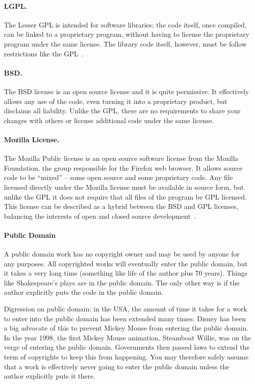 \paragraph{LGPL.} The Lesser GPL is intended for software libraries; the code itself, once compiled, can be linked to a proprietary program, without having to license the proprietary program under the same license. The library code itself, however, must be follow restrictions like the GPL~\cite{atwood:lic}.

\paragraph{BSD.} The BSD license is an open source license and it is quite permissive. It effectively allows any use of the code, even turning it into a proprietary product, but disclaims all liability. Unlike the GPL, there are no requirements to share your changes with others or license additional code under the same license.


\paragraph{Mozilla License.} The Mozilla Public license is an open source software license from the Mozilla Foundation, the group responsible for the Firefox web browser. It allows source code to be ``mixed'' -- some open source and some proprietary code. Any file licensed directly under the Mozilla license must be available in source form, but unlike the GPL it does not require that all files of the program be GPL licensed. This license can be described as a hybrid between the BSD and GPL licenses, balancing the interests of open and closed source development~\cite{mozlic}.

\paragraph{Public Domain} A public domain work has no copyright owner and may be used by anyone for any purposes. All copyrighted works will eventually enter the public domain, but it takes a very long time (something like life of the author plus 70 years). Things like Shakespeare's plays are in the public domain. The only other way is if the author explicitly puts the code in the public domain.

Digression on public domain: in the USA, the amount of time it takes for a work to enter into the public domain has been extended many times. Disney has been a big advocate of this to prevent Mickey Mouse from entering the public domain. In the year 1998, the first Mickey Mouse animation, Steamboat Willie, was on the verge of entering the public domain. Governments then passed laws to extend the term of copyrights to keep this from happening. You may therefore safely assume that a work is effectively never going to enter the public domain unless the author explicitly puts it there.

